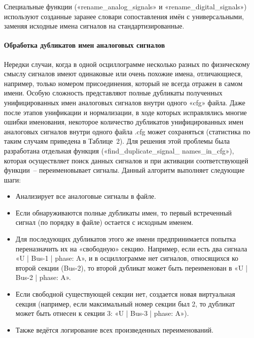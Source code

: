 Специальные функции («rename\_\allowbreak analog\_\allowbreak signals» и
«rename\_\allowbreak digital\_\allowbreak signals») используют созданные заранее словари
сопоставления имён с универсальными, заменяя исходные имена сигналов на
стандартизированные.

\paragraph{Обработка дубликатов имен аналоговых сигналов}
\mbox{}\par\vspace{0.2cm}

Нередки случаи, когда в одной осциллограмме несколько разных по физическому смыслу
сигналов имеют одинаковые или очень похожие имена, отличающиеся, например, только
номером присоединения, который не всегда отражен в самом имени. Особую сложность
представляют полные дубликаты полученных унифицированных имен аналоговых сигналов внутри
одного «cfg» файла. Даже после этапов унификации и нормализации, в ходе которых
исправлялись многие ошибки именования, некоторое количество дубликатов унифицированных
имен аналоговых сигналов внутри одного файла .cfg может сохраняться (статистика по таким
случаям приведена в Таблице~2). Для решения этой проблемы была разработана отдельная
функция («find\_\allowbreak duplicate\_\allowbreak signal\_\allowbreak
names\_\allowbreak in\_\allowbreak cfg»), которая осуществляет поиск данных сигналов и
при активации соответствующей функции~-- переименовывает сигналы. Данный алгоритм
выполняет следующие шаги:

\begin{itemize}
  \item Анализирует все аналоговые сигналы в файле.
  \item Если обнаруживаются полные дубликаты имен, то первый встреченный сигнал (по порядку в файле) остается с исходным именем.
  \item Для последующих дубликатов этого же имени предпринимается попытка переназначить их на «свободную» секцию. Например, если есть два сигнала «U | Bus-1 | phase: A», и в осциллограмме нет сигналов, относящихся ко второй секции (Bus-2), то второй дубликат может быть переименован в «U | Bus-2 | phase: A».
  \item Если свободной существующей секции нет, создается новая виртуальная секция (например, если максимальный номер секции был 2, то дубликат может быть отнесен к секции 3: «U | Bus-3 | phase: A»).
  \item Также ведётся логирование всех произведенных переименований.
\end{itemize}

